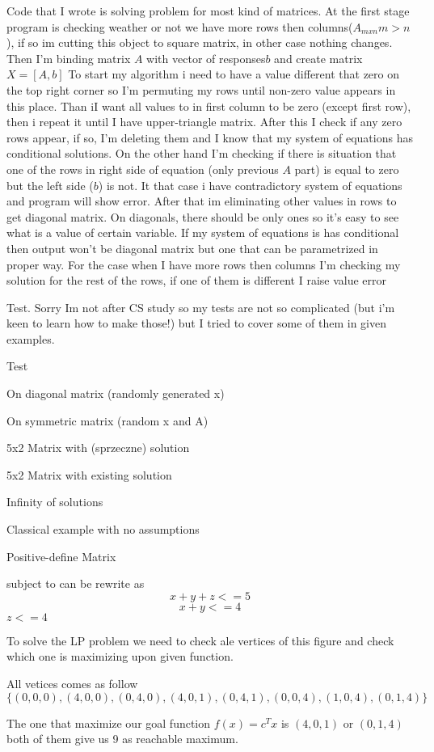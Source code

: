 
Code that I wrote is solving problem for most kind of matrices. 
At the first stage program is checking weather or not we have more rows then columns($A_{m x n} m>n$), 
if so im cutting this object to square matrix, in other case nothing changes. 
Then I'm binding matrix $ A$ with vector of responses$ b$ and create matrix $X = [A,b]$
To start my algorithm i need to have a value different that zero on the top right corner so I'm permuting my rows until non-zero value appears in this place.
Than iI want all values to in first column to be zero (except first row), then i repeat it until I have upper-triangle matrix. After this I check if any zero rows appear, if so, I'm deleting them and I know that my system of equations has conditional solutions. On the other hand I'm checking if there is situation that  one of the rows in right side of equation (only previous $A$ part) is equal to zero but the left side ($b$) is not. It that case i have  contradictory system of equations and program will show error.  After that im eliminating other values in rows to get  diagonal matrix. On diagonals, there should be only ones so it's easy to see what is a value of certain variable. If my system of equations is has conditional then output won't be diagonal matrix but one that can be parametrized in proper way. For the case when I have more rows then columns I'm checking my solution for the rest of the rows, if one of them is different I raise value error

Test. Sorry Im not after CS study so my tests are not so complicated (but i'm keen to learn how to make those!) but I tried to cover some of them  in given examples.

Test 

On diagonal matrix (randomly generated x)

On symmetric matrix (random x and A)

5x2 Matrix with (sprzeczne) solution 

5x2 Matrix with existing solution 

Infinity of solutions

Classical example with no assumptions 

Positive-define Matrix 

subject to can be rewrite as 
$$x + y + z <= 5$$
$$x + y       <= 4$$
$z <=4$


To solve the LP problem we need to check ale vertices of this figure and check which one is maximizing upon given function. 

All vetices comes as follow $\{(0,0,0),(4,0,0),(0,4,0),(4,0,1),(0,4,1),(0,0,4),(1,0,4),(0,1,4)\}$

The one that maximize our goal function $f(x) = c^Tx $ is $(4,0,1)$ or $(0,1,4)$ both of them give us 9 as reachable maximum.

                     
